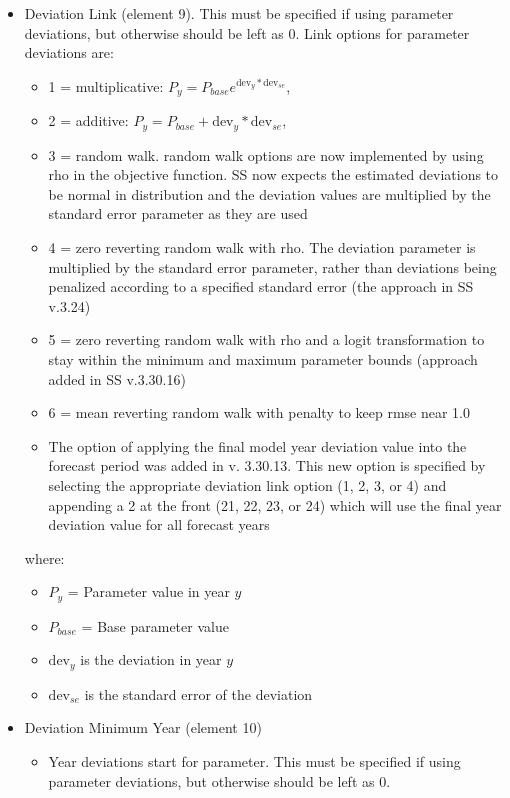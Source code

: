 \begin{itemize}
\item Deviation Link (element 9). This must be specified if using parameter deviations, but otherwise should be left as 0. Link options for parameter deviations are:
	\begin{itemize}
		\item 1 = multiplicative: $P_y = P_{base}e^{\text{dev}_y*\text{dev}_{se}}$,
		\item 2 = additive: $P_y = P_{base} + \text{dev}_y*\text{dev}_{se}$,
		\item 3 = random walk. random walk options are now implemented by using rho in the objective function. SS now expects the estimated deviations to be normal in distribution and the deviation values are multiplied by the standard error parameter as they are used
		\item 4 = zero reverting random walk with rho. The deviation parameter is multiplied by the standard error parameter, rather than deviations being penalized according to a specified standard error (the approach in SS v.3.24)
		\item 5 = zero reverting random walk with rho and a logit transformation to stay within the minimum and maximum parameter bounds (approach added in SS v.3.30.16)
		\item 6 = mean reverting random walk with penalty to keep rmse near 1.0
		\item The option of applying the final model year deviation value into the forecast period was added in v. 3.30.13.  This new option is specified by selecting the appropriate deviation link option (1, 2, 3, or 4) and appending a 2 at the front (21, 22, 23, or 24) which will use the final year deviation value for all forecast years
	\end{itemize}
	where: 
	\begin{itemize}
	     \item $P_{y}$ = Parameter value in year $y$
         \item $P_{base}$ = Base parameter value
		 \item $\text{dev}_y$ is the deviation in year $y$
		 \item $\text{dev}_{se}$ is the standard error of the deviation
	\end{itemize}
\item Deviation Minimum Year (element 10)
	\begin{itemize}
		\item Year deviations start for parameter. This must be specified if using parameter deviations, but otherwise should be left as 0.
	\end{itemize}
	

\end{itemize}
